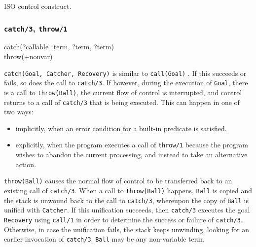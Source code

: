 \Portability

ISO control construct.

\subsubsection{\texttt{catch/3},
               \texttt{throw/1}}
\label{catch/3}

\begin{TemplatesOneCol}
catch(?callable\_term, ?term, ?term)\\
throw(+nonvar)

\end{TemplatesOneCol}

\Description

\texttt{catch(Goal, Catcher, Recovery)} is similar to \texttt{call(Goal)}
. If this succeeds or fails, so does the call to
\texttt{catch/3}. If however, during the execution of \texttt{Goal}, there
is a call to \texttt{throw(Ball)}, the current flow of control is
interrupted, and control returns to a call of \texttt{catch/3} that is being
executed. This can happen in one of two ways:

\begin{itemize}

\item implicitly, when an error condition for a built-in predicate is
satisfied.

\item explicitly, when the program executes a call of \texttt{throw/1}
because the program wishes to abandon the current processing, and instead to
take an alternative action.

\end{itemize}

\texttt{throw(Ball)} causes the normal flow of control to be transferred
back to an existing call of \texttt{catch/3}. When a call to
\texttt{throw(Ball)} happens, \texttt{Ball} is copied and the stack is
unwound back to the call to \texttt{catch/3}, whereupon the copy of
\texttt{Ball} is unified with \texttt{Catcher}. If this unification
succeeds, then \texttt{catch/3} executes the goal \texttt{Recovery} using
\texttt{call/1}  in order to determine the success or
failure of \texttt{catch/3}. Otherwise, in case the unification fails,
the stack keeps unwinding, looking for an earlier invocation of
\texttt{catch/3}. \texttt{Ball} may be any non-variable term.

\begin{PlErrors}


\end{PlErrors}

